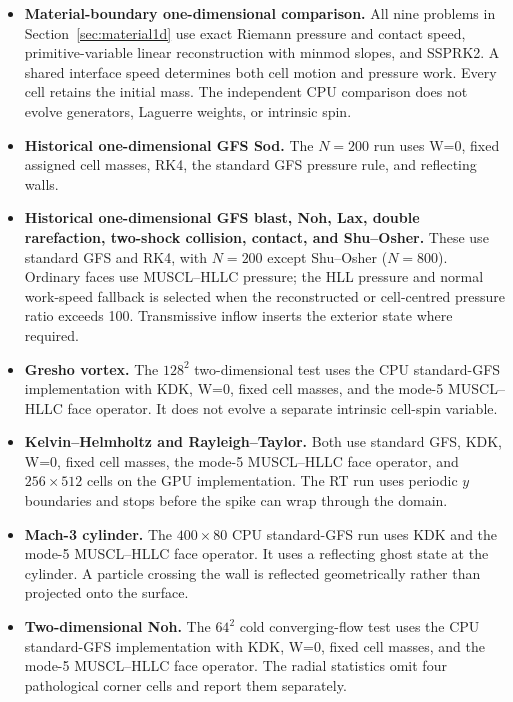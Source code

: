 \documentclass[twocolumn]{aastex63}
\begin{document}
\begin{itemize}
\item \textbf{Material-boundary one-dimensional comparison.} All nine
problems in Section~\ref{sec:material1d} use exact Riemann pressure and
contact speed, primitive-variable linear reconstruction with minmod slopes,
and SSPRK2. A shared interface speed determines both cell motion and
pressure work. Every cell retains the initial mass. The independent CPU
comparison does not evolve generators, Laguerre weights, or intrinsic spin.

\item \textbf{Historical one-dimensional GFS Sod.} The $N=200$ run uses W=0, fixed assigned
cell masses, RK4, the standard GFS pressure rule, and reflecting walls.

\item \textbf{Historical one-dimensional GFS blast, Noh, Lax, double rarefaction, two-shock
collision, contact, and Shu--Osher.} These use standard GFS and RK4, with
$N=200$ except Shu--Osher ($N=800$). Ordinary faces use MUSCL--HLLC pressure;
the HLL pressure and normal work-speed fallback is selected when the
reconstructed or cell-centred pressure ratio exceeds 100. Transmissive inflow
inserts the exterior state where required.

\item \textbf{Gresho vortex.} The $128^2$ two-dimensional test uses the CPU
standard-GFS implementation with KDK, W=0, fixed cell masses, and the mode-5
MUSCL--HLLC face operator. It does not evolve a separate intrinsic cell-spin
variable.

\item \textbf{Kelvin--Helmholtz and Rayleigh--Taylor.} Both use standard GFS,
KDK, W=0, fixed cell masses, the mode-5 MUSCL--HLLC face operator, and
$256\times512$ cells on the GPU implementation. The RT run uses periodic $y$
boundaries and stops before the spike can wrap through the domain.

\item \textbf{Mach-3 cylinder.} The $400\times80$ CPU standard-GFS run uses
KDK and the mode-5 MUSCL--HLLC face operator. It uses a reflecting ghost state
at the cylinder. A particle crossing the wall is reflected geometrically
rather than projected onto the surface.

\item \textbf{Two-dimensional Noh.} The $64^2$ cold converging-flow test uses
the CPU standard-GFS implementation with KDK, W=0, fixed cell masses, and the
mode-5 MUSCL--HLLC face operator. The radial statistics omit four
pathological corner cells and report them separately.


\end{itemize}
\end{document}
